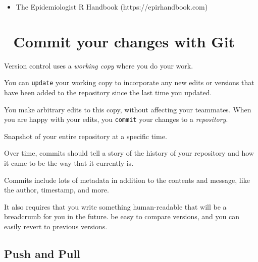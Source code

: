 \documentclass[
  letterpaper,
  DIV=11,
  numbers=noendperiod,
  oneside]{scrreprt}
\providecommand{\tightlist}{%
  \setlength{\itemsep}{0pt}\setlength{\parskip}{0pt}}\usepackage{longtable,booktabs,array}
\begin{document}
\begin{itemize}
\tightlist
\item
  The Epidemiologist R Handbook (https://epirhandbook.com)
\end{itemize}

\hypertarget{commit-your-changes-with-git}{%
\chapter{\texorpdfstring{{📘} Commit your changes with
Git}{📘 Commit your changes with Git}}\label{commit-your-changes-with-git}}

Version control uses a \emph{working copy} where you do your work.

\begin{tcolorbox}[enhanced jigsaw, colbacktitle=quarto-callout-note-color!10!white, titlerule=0mm, breakable, opacityback=0, opacitybacktitle=0.6, left=2mm, coltitle=black, colback=white, title=\textcolor{quarto-callout-note-color}{\faInfo}\hspace{0.5em}{Note}, rightrule=.15mm, colframe=quarto-callout-note-color-frame, toprule=.15mm, bottomtitle=1mm, toptitle=1mm, arc=.35mm, bottomrule=.15mm, leftrule=.75mm]
You can \texttt{update} your working copy to incorporate any new edits
or versions that have been added to the repository since the last time
you updated.
\end{tcolorbox}

You make arbitrary edits to this copy, without affecting your teammates.
When you are happy with your edits, you \texttt{commit} your changes to
a \emph{repository}.

Snapshot of your entire repository at a specific time.

Over time, commits should tell a story of the history of your repository
and how it came to be the way that it currently is.

Commits include lots of metadata in addition to the contents and
message, like the author, timestamp, and more.

It also requires that you write something human-readable that will be a
breadcrumb for you in the future. be easy to compare versions, and you
can easily revert to previous versions.

\hypertarget{push-and-pull}{%
\section{Push and Pull}\label{push-and-pull}}
\end{document}
